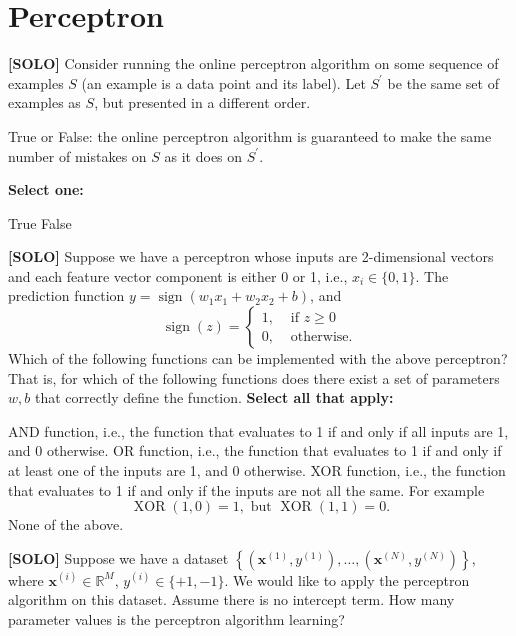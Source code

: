 \documentclass[11pt,addpoints,answers]{exam}
\newcommand{\xv}{\mathbf{x}}
\begin{document}
\section{Perceptron}
\begin{questions}
    \question[1] \textbf{[SOLO]} Consider running the online perceptron algorithm on some sequence of examples $S$ (an example is a data point and its label). Let $S^\prime$ be the same set of examples as $S$, but presented in a different order.
    
    True or False: the online perceptron algorithm is guaranteed to make the same number of mistakes on $S$ as it does on $S^\prime$.

    \textbf{Select one:}
    \begin{checkboxes}
        \choice True
        \choice False
    \end{checkboxes}


    
    \question[3] \textbf{[SOLO]} Suppose we have a perceptron whose inputs are 2-dimensional vectors and each feature vector component is either 0 or 1, i.e., $x_i \in \{0,1\}$. The prediction function $y = \operatorname{sign}(w_1x_1 + w_2x_2 + b)$, and
    $$
    \operatorname{sign}(z) = 
    \begin{cases}
    1, & \textrm{ if } z \geq 0\\
    0, & \textrm{ otherwise}.
    \end{cases}
    $$
    Which of the following functions can be implemented with the above perceptron? That is, for which of the following functions does there exist a set of parameters $w,b$ that correctly define the function. 
    \textbf{Select all that apply:}
    {
    \checkboxchar{$\Box$} \checkedchar{$\blacksquare$}
    \begin{checkboxes}
        \choice AND function, i.e., the function that evaluates to 1 if and only if all inputs are 1, and 0 otherwise.
        \choice OR function, i.e., the function that evaluates to 1 if and only if at least one of the inputs are 1, and 0 otherwise.
        \choice XOR function, i.e., the function that evaluates to 1 if and only if the inputs are not all the same. For example
        $$
        \operatorname{XOR}(1,0) = 1, \textrm{ but } \operatorname{XOR}(1,1) = 0.
        $$
        \choice None of the above.
    \end{checkboxes}
    }

    
    
    
    \question[2] \textbf{[SOLO]} Suppose we have a dataset $\left\{ \left(\xv^{(1)},y^{(1)}\right),\ldots, \left(\xv^{(N)},y^{(N)}\right) \right\}$, where $\xv^{(i)} \in \mathbb{R}^M$, $y^{(i)}\in\{+1,-1\}$. We would like to apply the perceptron algorithm on this dataset. Assume there is no intercept term. How many parameter values is the perceptron algorithm learning?


\end{questions}
\end{document}
